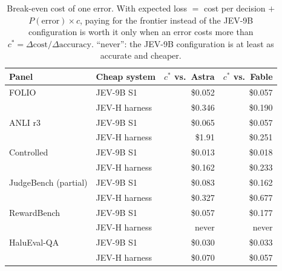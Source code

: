 \begin{table}[t]
\centering\small
\caption{Break-even cost of one error. With expected loss $=$ cost per decision $+$ $P(\text{error})\times c$, paying for the frontier instead of the JEV-9B configuration is worth it only when an error costs more than $c^*=\Delta\text{cost}/\Delta\text{accuracy}$. ``never'': the JEV-9B configuration is at least as accurate and cheaper.}
\label{tab:breakeven}
\begin{tabular}{@{}llrr@{}}
\toprule
Panel & Cheap system & $c^*$ vs.\ Astra & $c^*$ vs.\ Fable \\
\midrule
FOLIO & JEV-9B S1 & \$0.052 & \$0.057 \\
 & JEV-H harness & \$0.346 & \$0.190 \\
ANLI r3 & JEV-9B S1 & \$0.065 & \$0.057 \\
 & JEV-H harness & \$1.91 & \$0.251 \\
Controlled & JEV-9B S1 & \$0.013 & \$0.018 \\
 & JEV-H harness & \$0.162 & \$0.233 \\
JudgeBench (partial) & JEV-9B S1 & \$0.083 & \$0.162 \\
 & JEV-H harness & \$0.327 & \$0.677 \\
RewardBench & JEV-9B S1 & \$0.057 & \$0.177 \\
 & JEV-H harness & never & never \\
HaluEval-QA & JEV-9B S1 & \$0.030 & \$0.033 \\
 & JEV-H harness & \$0.070 & \$0.057 \\
\bottomrule
\end{tabular}
\end{table}
